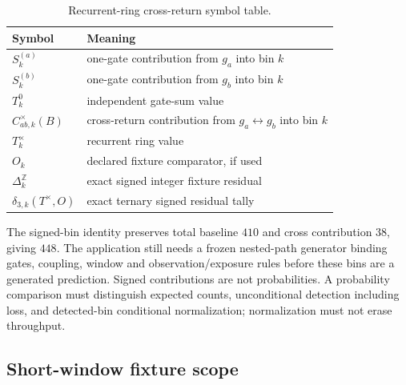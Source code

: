 \begin{table}[h]
\centering
\scriptsize
\caption{Recurrent-ring cross-return symbol table.}
\begin{tabular}{l l}
\toprule
Symbol & Meaning\\
\midrule
$S^{(a)}_k$ & one-gate contribution from $g_a$ into bin $k$\\
$S^{(b)}_k$ & one-gate contribution from $g_b$ into bin $k$\\
$T^0_k$ & independent gate-sum value\\
$C_{ab,k}^{\times}(B)$ & cross-return contribution from $g_a\leftrightarrow g_b$ into bin $k$\\
$T^\times_k$ & recurrent ring value\\
$O_k$ & declared fixture comparator, if used\\
$\Delta_k^{\mathbb Z}$ & exact signed integer fixture residual\\
$\delta_{3,k}(T^\times,O)$ & exact ternary signed residual tally\\
\bottomrule
\end{tabular}
\label{tab:manual-recurrent-ring-symbols}
\end{table}

The signed-bin identity preserves total baseline \(410\) and cross contribution
\(38\), giving \(448\). The application still needs a frozen nested-path
generator binding gates, coupling, window and observation/exposure rules
before these bins are a generated prediction. Signed contributions are not
probabilities. A probability comparison must distinguish expected counts,
unconditional detection including loss, and detected-bin conditional
normalization; normalization must not erase throughput.


\subsection{Short-window fixture scope}\label{manual:short-window:scope}

